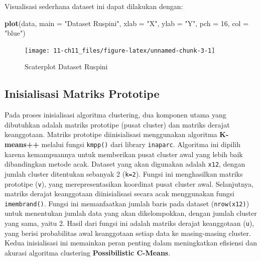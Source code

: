 \documentclass[
  oneside]{book}
\newenvironment{Shaded}{\begin{snugshade}}{\end{snugshade}}
\newcommand{\AttributeTok}[1]{\textcolor[rgb]{0.13,0.29,0.53}{#1}}
\newcommand{\DecValTok}[1]{\textcolor[rgb]{0.00,0.00,0.81}{#1}}
\newcommand{\FunctionTok}[1]{\textcolor[rgb]{0.13,0.29,0.53}{\textbf{#1}}}
\newcommand{\NormalTok}[1]{#1}
\newcommand{\StringTok}[1]{\textcolor[rgb]{0.31,0.60,0.02}{#1}}
\begin{document}
Visualisasi sederhana dataset ini dapat dilakukan dengan:

\begin{Shaded}
\begin{Highlighting}[]
\FunctionTok{plot}\NormalTok{(data, }\AttributeTok{main =} \StringTok{"Dataset Ruspini"}\NormalTok{, }\AttributeTok{xlab =} \StringTok{"X"}\NormalTok{, }\AttributeTok{ylab =} \StringTok{"Y"}\NormalTok{, }\AttributeTok{pch =} \DecValTok{16}\NormalTok{, }\AttributeTok{col =} \StringTok{"blue"}\NormalTok{)}
\end{Highlighting}
\end{Shaded}

\begin{figure}[h]

{\centering \texttt{[image: 11-ch11\_files/figure-latex/unnamed-chunk-3-1]} 

}

\caption{Scaterplot Dataset Ruspini}\label{fig:unnamed-chunk-3}
\end{figure}

\subsection*{Inisialisasi Matriks Prototipe}\label{inisialisasi-matriks-prototipe}

Pada proses inisialisasi algoritma clustering, dua komponen utama yang dibutuhkan adalah matriks prototipe (pusat cluster) dan matriks derajat keanggotaan. Matriks prototipe diinisialisasi menggunakan algoritma \textbf{K-means++} melalui fungsi \texttt{kmpp()} dari library \texttt{inaparc}. Algoritma ini dipilih karena kemampuannya untuk memberikan pusat cluster awal yang lebih baik dibandingkan metode acak. Dataset yang akan digunakan adalah \texttt{x12}, dengan jumlah cluster ditentukan sebanyak 2 (\texttt{k=2}). Fungsi ini menghasilkan matriks prototipe (\texttt{v}), yang merepresentasikan koordinat pusat cluster awal. Selanjutnya, matriks derajat keanggotaan diinisialisasi secara acak menggunakan fungsi \texttt{imembrand()}. Fungsi ini memanfaatkan jumlah baris pada dataset (\texttt{nrow(x12)}) untuk menentukan jumlah data yang akan dikelompokkan, dengan jumlah cluster yang sama, yaitu 2. Hasil dari fungsi ini adalah matriks derajat keanggotaan (\texttt{u}), yang berisi probabilitas awal keanggotaan setiap data ke masing-masing cluster. Kedua inisialisasi ini memainkan peran penting dalam meningkatkan efisiensi dan akurasi algoritma clustering \textbf{Possibilistic C-Means}.
\end{document}
